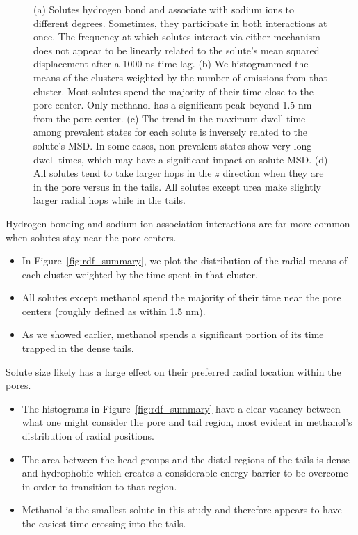 \documentclass{article}
\begin{document}
\begin{figure}
  \caption{(a) Solutes hydrogen bond and associate with sodium ions
  to different degrees. Sometimes, they participate in both interactions at
  once. The frequency at which solutes interact via either mechanism does
  not appear to be linearly related to the solute's mean squared displacement
  after a 1000 ns time lag. (b) We histogrammed the means of the clusters weighted
  by the number of 
  emissions from that cluster. Most solutes spend the majority of
  their time close to the pore center. Only methanol has a significant peak
  beyond 1.5 nm from the pore center. (c) The trend in the maximum dwell time
  among prevalent states for each solute is inversely related to the
  solute's MSD. In some cases, non-prevalent states show very long dwell times,
  which may have a significant impact on solute MSD. (d) All solutes tend to
  take larger hops in the $z$ direction when they are in the pore versus in 
  the tails. All solutes except urea make slightly larger radial hops while 
  in the tails.
  }\label{fig:summaries}
  \end{figure}
  
  Hydrogen bonding and sodium ion association interactions are far more 
  common when solutes stay near the pore centers.
  \begin{itemize}
    \item In Figure~\ref{fig:rdf_summary}, we plot the distribution of the 
    radial means of each cluster weighted by the time spent in that cluster.
    \item All solutes except methanol spend the majority of their time near
    the pore centers (roughly defined as within 1.5 nm).
    \item As we showed earlier, methanol spends a significant portion of its
    time trapped in the dense tails.
  \end{itemize}
  
  Solute size likely has a large effect on their preferred radial location within
  the pores.
  \begin{itemize}
    \item The histograms in Figure~\ref{fig:rdf_summary} have a clear vacancy between
    what one might consider the pore and tail region, most evident in methanol's 
    distribution of radial positions.
    \item The area between the head groups and the distal regions of the tails is
    dense and hydrophobic which creates a considerable energy barrier to be overcome
    in order to transition to that region.
    \item Methanol is the smallest solute in this study and therefore appears to 
    have the easiest time crossing into the tails. 
  \end{itemize}
\end{document}
